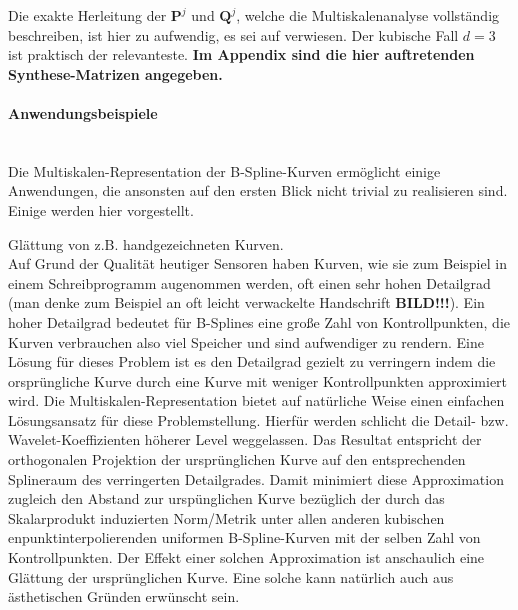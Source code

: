 \documentclass{article}
\begin{document}
\noindent Die exakte Herleitung der $\mathbf{P}^j$ und $\mathbf{Q}^j$, welche die Multiskalenanalyse vollständig beschreiben, ist hier zu aufwendig, es sei auf \cite{finkelstein94} verwiesen. Der kubische Fall $d=3$ ist praktisch der relevanteste. \textbf{Im Appendix sind die hier auftretenden Synthese-Matrizen angegeben.}


\paragraph{Anwendungsbeispiele}~\\
Die Multiskalen-Representation der B-Spline-Kurven ermöglicht einige Anwendungen, die ansonsten auf den ersten Blick nicht trivial zu realisieren sind. Einige werden hier vorgestellt.

Glättung von z.B. handgezeichneten Kurven.\\
Auf Grund der Qualität heutiger Sensoren haben Kurven, wie sie zum Beispiel in einem Schreibprogramm augenommen werden, oft einen sehr hohen Detailgrad (man denke zum Beispiel an oft leicht verwackelte Handschrift \textbf{BILD!!!}). Ein hoher Detailgrad bedeutet für B-Splines eine große Zahl von Kontrollpunkten, die Kurven verbrauchen also viel Speicher und sind aufwendiger zu rendern. Eine Lösung für dieses Problem ist es den Detailgrad gezielt zu verringern indem die orsprüngliche Kurve durch eine Kurve mit weniger Kontrollpunkten approximiert wird. Die Multiskalen-Representation bietet auf natürliche Weise einen einfachen Lösungsansatz für diese Problemstellung. Hierfür werden schlicht die Detail- bzw. Wavelet-Koeffizienten höherer Level weggelassen. Das Resultat entspricht der orthogonalen Projektion der ursprünglichen Kurve auf den entsprechenden Splineraum des verringerten Detailgrades. Damit minimiert diese Approximation zugleich den Abstand zur urspünglichen Kurve bezüglich der durch das Skalarprodukt induzierten Norm/Metrik unter allen anderen kubischen enpunktinterpolierenden uniformen B-Spline-Kurven mit der selben Zahl von Kontrollpunkten.
Der Effekt einer solchen Approximation ist anschaulich eine Glättung der ursprünglichen Kurve. Eine solche kann natürlich auch aus ästhetischen Gründen erwünscht sein.
\end{document}
